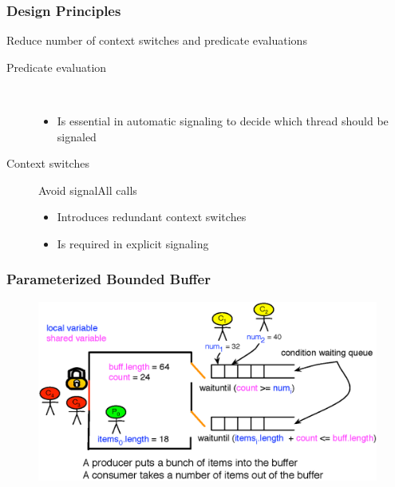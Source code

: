 \documentclass[mathserif,14pt,xcolor=table]{beamer}
\begin{document}
\begin{frame}
    \frametitle{Design Principles}
    Reduce number of context switches and predicate evaluations
    \begin{description}
      \item[Predicate evaluation] \  
        \begin{itemize}
            \item Is essential in automatic signaling to decide which thread
              should be signaled
        \end{itemize}
        
      \item[Context switches] Avoid signalAll calls
        \begin{itemize}
            \item Introduces redundant context switches
            \item Is required in explicit signaling 
        \end{itemize}
    \end{description}
\end{frame}
\begin{frame}
    \frametitle{Parameterized Bounded Buffer}
    \begin{figure}[ht!]
        \centering
        \includegraphics[scale=0.75]{fig/pbb.eps}
        \label{fig:fw}
    \end{figure}
\end{frame}
\end{document}
